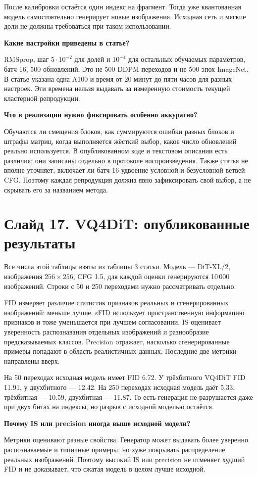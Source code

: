 \documentclass[a4paper,11pt]{article}
\newcommand{\slide}[2]{\clearpage\section*{Слайд #1. #2}}
\newcommand{\question}[1]{\par\textbf{#1}\par}
\begin{document}
После калибровки остаётся один индекс на фрагмент.
Тогда уже квантованная модель самостоятельно генерирует
новые изображения. Исходная сеть и мягкие доли не должны
требоваться при таком использовании.

\question{Какие настройки приведены в статье?}
RMSprop, шаг $5\cdot10^{-2}$ для долей и $10^{-4}$ для
остальных обучаемых параметров, батч 16, 500 обновлений.
Это не 500 DDPM-переходов и не 500 эпох ImageNet.
В статье указана одна A100 и время от 20 минут до пяти часов
для разных настроек. Эти времена нельзя выдавать за
измеренную стоимость текущей кластерной репродукции.

\question{Что в реализации нужно фиксировать особенно аккуратно?}
Обучаются ли смещения блоков, как суммируются ошибки разных
блоков и штрафы матриц, когда выполняется жёсткий выбор,
какое число обновлений реально используется. В опубликованном
коде и текстовом описании есть различия; они записаны
отдельно в протоколе воспроизведения. Также статья не вполне
уточняет, включает ли батч 16 удвоение условной и безусловной
ветвей CFG. Поэтому каждая репродукция должна явно
зафиксировать свой выбор, а не скрывать его за названием метода.

\slide{17}{VQ4DiT: опубликованные результаты}
Все числа этой таблицы взяты из таблицы 3 статьи.
Модель --- DiT-XL/2, изображения $256\times256$, CFG 1.5,
для каждой оценки генерируются 10\,000 изображений.
Строки с 50 и 250 переходами нужно рассматривать отдельно.

FID измеряет различие статистик признаков реальных
и сгенерированных изображений: меньше лучше.
sFID использует пространственную информацию признаков
и тоже уменьшается при лучшем согласовании.
IS оценивает уверенность распознавания отдельных изображений
и разнообразие предсказываемых классов. Precision отражает,
насколько сгенерированные примеры попадают в область
реалистичных данных. Последние две метрики направлены вверх.

На 50 переходах исходная модель имеет FID 6.72.
У трёхбитного VQ4DiT FID 11.91, у двухбитного --- 12.42.
На 250 переходах исходная модель даёт 5.33,
трёхбитная --- 10.59, двухбитная --- 11.87.
То есть генерация не разрушается даже при двух битах
на индексы, но разрыв с исходной моделью остаётся.

\question{Почему IS или precision иногда выше исходной модели?}
Метрики оценивают разные свойства. Генератор может выдавать
более уверенно распознаваемые и типичные примеры,
но хуже покрывать распределение реальных изображений.
Поэтому высокий IS или precision не отменяет худший FID
и не доказывает, что сжатая модель в целом лучше исходной.
\end{document}
